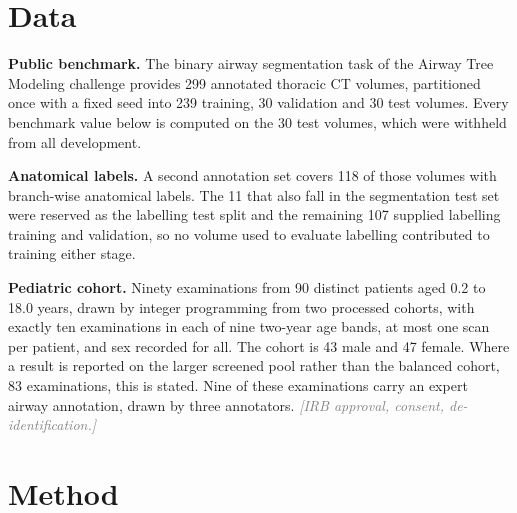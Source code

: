 \documentclass[runningheads]{llncs}
\newcommand{\todo}[1]{\textcolor{gray}{\textit{[#1]}}}
\begin{document}
\section{Data}
\label{sec:data}

\textbf{Public benchmark.} The binary airway segmentation task of the Airway
Tree Modeling challenge \cite{atm22} provides 299 annotated thoracic CT
volumes, partitioned
once with a fixed seed into 239 training, 30 validation and 30 test volumes.
Every benchmark value below is computed on the 30 test volumes, which were
withheld from all development.

\textbf{Anatomical labels.} A second annotation set covers 118 of those volumes
with branch-wise anatomical labels. The 11 that also fall in the segmentation
test set were reserved as the labelling test split and the remaining 107
supplied labelling training and validation, so no volume used to evaluate
labelling contributed to training either stage.

\textbf{Pediatric cohort.} Ninety examinations from 90 distinct patients aged
0.2 to 18.0 years, drawn by integer programming from two processed cohorts, with
exactly ten examinations in each of nine two-year age bands, at most one scan per
patient, and sex recorded for all. The cohort is 43 male and 47 female. Where a
result is reported on the larger screened pool rather than the balanced cohort,
83 examinations, this is stated. Nine of these examinations carry an expert
airway annotation, drawn by three annotators.
\todo{IRB approval, consent, de-identification.}

\section{Method}
\label{sec:method}
\end{document}
